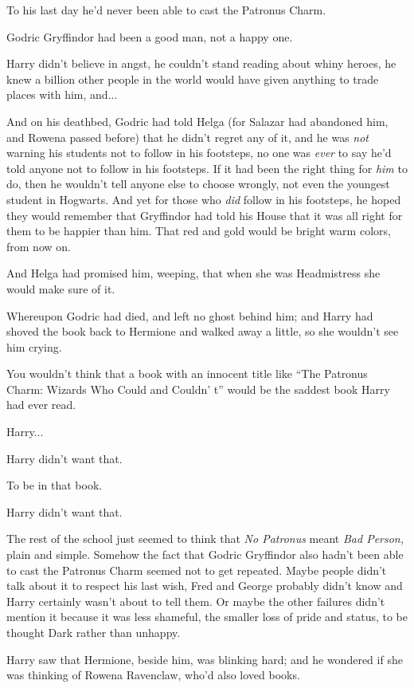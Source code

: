 To his last day he'd never been able to cast the Patronus Charm.

Godric Gryffindor had been a good man, not a happy one.

Harry didn't believe in angst, he couldn't stand reading about whiny heroes, he knew a billion other people in the world would have given anything to trade places with him, and...

And on his deathbed, Godric had told Helga (for Salazar had abandoned him, and Rowena passed before) that he didn't regret any of it, and he was \emph{not} warning his students not to follow in his footsteps, no one was \emph{ever} to say he'd told anyone not to follow in his footsteps. If it had been the right thing for \emph{him} to do, then he wouldn't tell anyone else to choose wrongly, not even the youngest student in Hogwarts. And yet for those who \emph{did} follow in his footsteps, he hoped they would remember that Gryffindor had told his House that it was all right for them to be happier than him. That red and gold would be bright warm colors, from now on.

And Helga had promised him, weeping, that when she was Headmistress she would make sure of it.

Whereupon Godric had died, and left no ghost behind him; and Harry had shoved the book back to Hermione and walked away a little, so she wouldn't see him crying.

You wouldn't think that a book with an innocent title like ``The Patronus Charm: Wizards Who Could and Couldn' t'' would be the saddest book Harry had ever read.

Harry...

Harry didn't want that.

To be in that book.

Harry didn't want that.

The rest of the school just seemed to think that \emph{No Patronus} meant \emph{Bad Person,} plain and simple. Somehow the fact that Godric Gryffindor also hadn't been able to cast the Patronus Charm seemed not to get repeated. Maybe people didn't talk about it to respect his last wish, Fred and George probably didn't know and Harry certainly wasn't about to tell them. Or maybe the other failures didn't mention it because it was less shameful, the smaller loss of pride and status, to be thought Dark rather than unhappy.

Harry saw that Hermione, beside him, was blinking hard; and he wondered if she was thinking of Rowena Ravenclaw, who'd also loved books.

